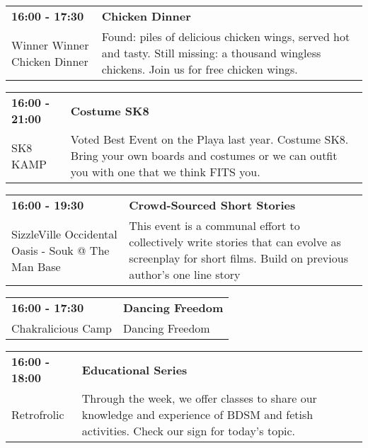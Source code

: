 \begin{tabular}{ p{1in} p{2.2in} }
    \textbf{16:00 - 17:30} & \textbf{Chicken Dinner} \\
    Winner Winner Chicken Dinner \newline  & Found: piles of delicious chicken wings, served hot and tasty. Still missing: a thousand wingless chickens. Join us for free chicken wings. \\
    \hline 
\end{tabular}
    
\begin{tabular}{ p{1in} p{2.2in} }
    \textbf{16:00 - 21:00} & \textbf{Costume SK8} \\
    SK8 KAMP \newline  & Voted Best Event on the Playa last year.  Costume SK8.  Bring your own boards and costumes or we can outfit you with one that we think FITS you. \\
    \hline 
\end{tabular}
    
\begin{tabular}{ p{1in} p{2.2in} }
    \textbf{16:00 - 19:30} & \textbf{Crowd-Sourced Short Stories} \\
    SizzleVille \newline Occidental Oasis - Souk @ The Man Base & This event is a communal effort to collectively write stories that can evolve as screenplay for short films. Build on previous author's one line story \\
    \hline 
\end{tabular}
    
\begin{tabular}{ p{1in} p{2.2in} }
    \textbf{16:00 - 17:30} & \textbf{Dancing Freedom} \\
    Chakralicious Camp \newline  & Dancing Freedom \\
    \hline 
\end{tabular}
    
\begin{tabular}{ p{1in} p{2.2in} }
    \textbf{16:00 - 18:00} & \textbf{Educational Series} \\
    Retrofrolic \newline  & Through the week, we offer classes to share our knowledge and experience of BDSM and fetish activities.  Check our sign for today's topic. \\
    \hline 
\end{tabular}
    
